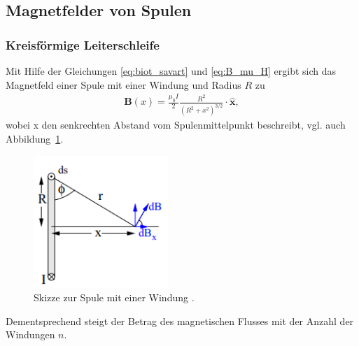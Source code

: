 \subsection{Magnetfelder von Spulen}
\label{sec:magnetfelder_von_spulen}

\subsubsection{Kreisförmige Leiterschleife}
Mit Hilfe der Gleichungen \eqref{eq:biot_savart} und \eqref{eq:B_mu_H} ergibt sich das Magnetfeld einer Spule mit einer Windung und Radius $R$ zu
\begin{align}
    \label{eq:kreisfoermige_leiterschleife}
    \symbf{B}(x) = \frac{\mu_0 I}{2} \frac{R^2}{\left(R^2 + x^2\right)^{3/2}} \cdot \hat{\symbf{x}},
\end{align}
wobei x den senkrechten Abstand vom Spulenmittelpunkt beschreibt, vgl. auch Abbildung~\ref{fig:spule_eine_Windung}.
%
\begin{figure}[H]
    \centering
    \includegraphics*[height = 5cm]{./abbildungen/spule_eine_windung.png}
    \caption[]{Skizze zur Spule mit einer Windung \cite{man:v308}.}
    \label{fig:spule_eine_Windung}
\end{figure}
\noindent
Dementsprechend steigt der Betrag des magnetischen Flusses mit der Anzahl der Windungen $n$.

